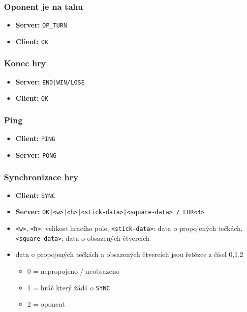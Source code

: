 \documentclass[11pt,a4paper]{article}
\begin{document}
\subsubsection*{Oponent je na tahu}
\begin{itemize}
	\item \textbf{Server:} \texttt{OP\_TURN}
	\item \textbf{Client:} \texttt{OK}
\end{itemize}

\subsubsection*{Konec hry}
\begin{itemize}
	\item \textbf{Server:} \texttt{END|WIN/LOSE}
	\item \textbf{Client:} \texttt{OK}
\end{itemize}

\subsubsection*{Ping}
\begin{itemize}
	\item \textbf{Client:} \texttt{PING}
	\item \textbf{Server:} \texttt{PONG}
\end{itemize}

\subsubsection*{Synchronizace hry}
\begin{itemize}
	\item \textbf{Client:} \texttt{SYNC}
	\item \textbf{Server:} \texttt{OK|<w>|<h>|<stick-data>|<square-data> / ERR<4>}
	\item \texttt{<w>}, \texttt{<h>}: velikost hracího pole, \texttt{<stick-data>}: data o propojených tečkách, \texttt{<square-data>}: data o obsazených čtvercích
	\item data o propojených tečkách a obsazených čtvercích jsou řetězce z čísel 0,1,2
	\begin{itemize}
		\item 0 = nepropojeno / neobsazeno
		\item 1 = hráč který žádá o \texttt{SYNC}
		\item 2 = oponent
	\end{itemize}
\end{itemize}
\end{document}
